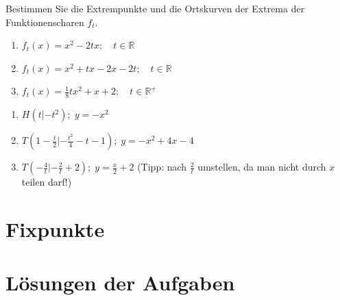 \documentclass[12pt,a4paper,twoside,fleqn]{article}
\begin{document}
\begin{question}
  Bestimmen Sie die Extrempunkte und die Ortskurven der Extrema der
  Funktionenscharen $f_t$.
  \begin{multicols}{2}
    \begin{enumerate}
    \item $f_t(x)=x^2-2tx;\quad t\in\mathbb{R}$
    \item $f_t(x)=x^2+tx-2x-2t;\quad t\in\mathbb{R}$
    \item $f_t(x)=\frac 1 8 tx^2+x+2;\quad t\in\mathbb{R}^+$
    \end{enumerate}
  \end{multicols}
\end{question}
\begin{solution}
  \begin{multicols}{2}
    \begin{enumerate}
    \item $H(t|-t^2);\;y=-x^2$
    \item $T(1-\frac t 2|-\frac {t^2} 4 -t -1);\; y=-x^2+4x-4$
    \item $T(-\frac 4 t|-\frac 2 t+2);\; y=\frac x 2 +2$ (Tipp: nach
      $\frac 2 t$ umstellen, da man nicht durch $x$ teilen darf!)
    \end{enumerate}
  \end{multicols}
\end{solution}

\section{Fixpunkte}

 
\section{Lösungen der Aufgaben}
{\scriptsize\printsolutions}
\end{document}
